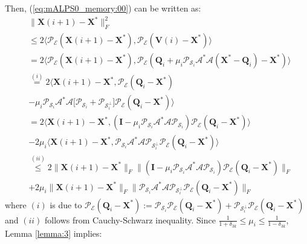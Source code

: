 \documentclass[twocolumn]{svjour3}
\newcommand{\vectornormbig}[1]{\big\|#1\big\|}
\newcommand{\sensing}{\boldsymbol{\mathcal{A}}}
\newcommand{\signal}{\boldsymbol{X}}
\newcommand{\bestsignal}{\boldsymbol{X}^\ast}
\newcommand{\id}{\mathbf{I}}
\newcommand{\rank}{k}
\begin{document}
Then, (\ref{eq:mALPS0_memory:00}) can be written as:
\begin{align}
&\vectornormbig{\signal(i+1) - \bestsignal}_F^2 \nonumber \\
&\leq 2\langle \mathcal{P}_{\mathcal{E}}(\signal(i+1) - \bestsignal), \mathcal{P}_{\mathcal{E}}(\boldsymbol{V}(i) - \bestsignal) \rangle \nonumber \\
 &= 2\langle \mathcal{P}_{\mathcal{E}}(\signal(i+1) - \bestsignal), \mathcal{P}_{\mathcal{E}}\left(\boldsymbol{Q}_i + \mu_i \mathcal{P}_{\mathcal{S}_i} \sensing^\ast \sensing (\bestsignal - \boldsymbol{Q}_i) - \bestsignal\right) \rangle \nonumber \\
&\stackrel{(i)}{=} 2\langle \signal(i+1) - \bestsignal, \mathcal{P}_{\mathcal{E}}(\boldsymbol{Q}_i - \bestsignal) \nonumber \\ &- \mu_i \mathcal{P}_{\mathcal{S}_i}\sensing^\ast \sensing \big[\mathcal{P}_{\mathcal{S}_i} + \mathcal{P}_{\mathcal{S}_i^{\bot}}\big]\mathcal{P}_{\mathcal{E}} (\boldsymbol{Q}_i - \bestsignal) \rangle \nonumber \\
& = 2\langle \signal(i+1) - \bestsignal, (\id - \mu_i\mathcal{P}_{\mathcal{S}_i}\sensing^\ast \sensing \mathcal{P}_{\mathcal{S}_i}) \mathcal{P}_{\mathcal{E}} (\boldsymbol{Q}_i - \bestsignal) \rangle \nonumber \\ &- 2\mu_i \langle \signal(i+1) - \bestsignal, \mathcal{P}_{\mathcal{S}_i}\sensing^\ast \sensing \mathcal{P}_{\mathcal{S}_i^{\bot}} \mathcal{P}_{\mathcal{E}} (\boldsymbol{Q}_i - \bestsignal) \rangle \nonumber \\
&\stackrel{(ii)}{\leq} 2\vectornormbig{\signal(i+1) - \bestsignal}_F \vectornormbig{ (\id - \mu_i \mathcal{P}_{\mathcal{S}_i}\sensing^\ast \sensing \mathcal{P}_{\mathcal{S}_i}) \mathcal{P}_{\mathcal{E}} (\boldsymbol{Q}_i - \bestsignal)}_F \nonumber \\ &+ 2\mu_i \vectornormbig{\signal(i+1) - \bestsignal}_F \vectornormbig{\mathcal{P}_{\mathcal{S}_i}\sensing^\ast \sensing \mathcal{P}_{\mathcal{S}_i^{\bot}}\mathcal{P}_{\mathcal{E}}(\boldsymbol{Q}_i - \bestsignal)}_F \label{eq:mALPS_memory:04}
\end{align} where $ (i) $ is due to $ \mathcal{P}_{\mathcal{E}}(\boldsymbol{Q}_i - \bestsignal) := \mathcal{P}_{\mathcal{S}_i} \mathcal{P}_{\mathcal{E}}(\boldsymbol{Q}_i - \bestsignal) + \mathcal{P}_{\mathcal{S}_i^{\bot}} \mathcal{P}_{\mathcal{E}}(\boldsymbol{Q}_i - \bestsignal) $ and $ (ii) $ follows from Cauchy-Schwarz inequality. 
Since $ \frac{1}{1+\delta_{3\rank}} \leq \mu_i \leq \frac{1}{1-\delta_{3\rank}} $, Lemma \ref{lemma:3} implies:
\end{document}
